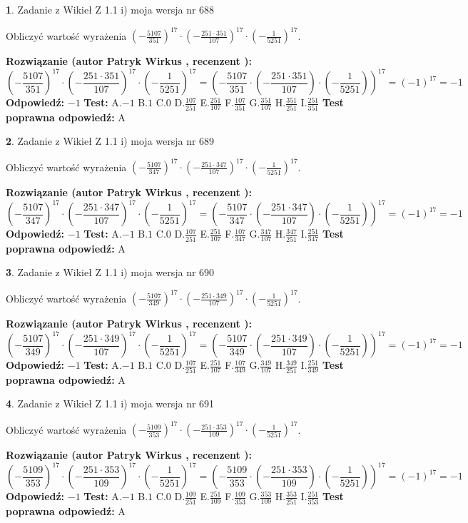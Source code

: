 \documentclass[12pt, a4paper]{article}
\theoremstyle{definition} %
\newtheorem{zad}{}
\newcommand{\zadStart}[1]{\begin{zad}#1\newline}
\newcommand{\zadStop}{\end{zad}}
\newcommand{\rozwStart}[2]{\noindent \textbf{Rozwiązanie (autor #1 , recenzent #2): }\newline}
\newcommand{\rozwStop}{\newline}
\newcommand{\odpStart}{\noindent \textbf{Odpowiedź:}\newline}
\newcommand{\odpStop}{\newline}
\newcommand{\testStart}{\noindent \textbf{Test:}\newline}
\newcommand{\testStop}{\newline}
\newcommand{\kluczStart}{\noindent \textbf{Test poprawna odpowiedź:}\newline}
\newcommand{\kluczStop}{\newline}
\begin{document}
\zadStart{Zadanie z Wikieł Z 1.1 i) moja wersja nr 688}

Obliczyć wartość wyrażenia $(-\frac{5107}{351})^{17} \cdot (-\frac{251 \cdot 351}{107})^{17} \cdot (-\frac{1}{5251})^{17}$.
\zadStop
\rozwStart{Patryk Wirkus}{}
$$(-\frac{5107}{351})^{17} \cdot (-\frac{251 \cdot 351}{107})^{17} \cdot (-\frac{1}{5251})^{17} = (-\frac{5107}{351} \cdot (-\frac{251 \cdot 351}{107}) \cdot (-\frac{1}{5251}))^{17} = (-1)^{17} = -1$$
\rozwStop
\odpStart
$-1$
\odpStop
\testStart
A.$-1$ B.$1$ C.$0$ D.$\frac{107}{251}$ E.$\frac{251}{107}$
F.$\frac{107}{351}$ G.$\frac{351}{107}$
H.$\frac{351}{251}$
I.$\frac{251}{351}$
\testStop
\kluczStart
A
\kluczStop



\zadStart{Zadanie z Wikieł Z 1.1 i) moja wersja nr 689}

Obliczyć wartość wyrażenia $(-\frac{5107}{347})^{17} \cdot (-\frac{251 \cdot 347}{107})^{17} \cdot (-\frac{1}{5251})^{17}$.
\zadStop
\rozwStart{Patryk Wirkus}{}
$$(-\frac{5107}{347})^{17} \cdot (-\frac{251 \cdot 347}{107})^{17} \cdot (-\frac{1}{5251})^{17} = (-\frac{5107}{347} \cdot (-\frac{251 \cdot 347}{107}) \cdot (-\frac{1}{5251}))^{17} = (-1)^{17} = -1$$
\rozwStop
\odpStart
$-1$
\odpStop
\testStart
A.$-1$ B.$1$ C.$0$ D.$\frac{107}{251}$ E.$\frac{251}{107}$
F.$\frac{107}{347}$ G.$\frac{347}{107}$
H.$\frac{347}{251}$
I.$\frac{251}{347}$
\testStop
\kluczStart
A
\kluczStop



\zadStart{Zadanie z Wikieł Z 1.1 i) moja wersja nr 690}

Obliczyć wartość wyrażenia $(-\frac{5107}{349})^{17} \cdot (-\frac{251 \cdot 349}{107})^{17} \cdot (-\frac{1}{5251})^{17}$.
\zadStop
\rozwStart{Patryk Wirkus}{}
$$(-\frac{5107}{349})^{17} \cdot (-\frac{251 \cdot 349}{107})^{17} \cdot (-\frac{1}{5251})^{17} = (-\frac{5107}{349} \cdot (-\frac{251 \cdot 349}{107}) \cdot (-\frac{1}{5251}))^{17} = (-1)^{17} = -1$$
\rozwStop
\odpStart
$-1$
\odpStop
\testStart
A.$-1$ B.$1$ C.$0$ D.$\frac{107}{251}$ E.$\frac{251}{107}$
F.$\frac{107}{349}$ G.$\frac{349}{107}$
H.$\frac{349}{251}$
I.$\frac{251}{349}$
\testStop
\kluczStart
A
\kluczStop



\zadStart{Zadanie z Wikieł Z 1.1 i) moja wersja nr 691}

Obliczyć wartość wyrażenia $(-\frac{5109}{353})^{17} \cdot (-\frac{251 \cdot 353}{109})^{17} \cdot (-\frac{1}{5251})^{17}$.
\zadStop
\rozwStart{Patryk Wirkus}{}
$$(-\frac{5109}{353})^{17} \cdot (-\frac{251 \cdot 353}{109})^{17} \cdot (-\frac{1}{5251})^{17} = (-\frac{5109}{353} \cdot (-\frac{251 \cdot 353}{109}) \cdot (-\frac{1}{5251}))^{17} = (-1)^{17} = -1$$
\rozwStop
\odpStart
$-1$
\odpStop
\testStart
A.$-1$ B.$1$ C.$0$ D.$\frac{109}{251}$ E.$\frac{251}{109}$
F.$\frac{109}{353}$ G.$\frac{353}{109}$
H.$\frac{353}{251}$
I.$\frac{251}{353}$
\testStop
\kluczStart
A
\kluczStop
\end{document}
